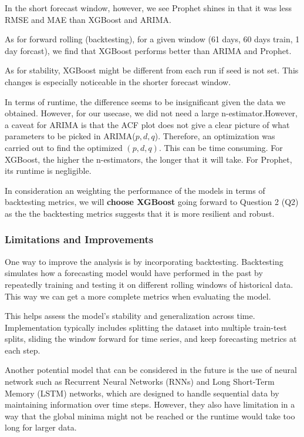 \documentclass[11pt]{article}
\begin{document}
In the short forecast window, however, we see Prophet shines in that it
was less RMSE and MAE than XGBoost and ARIMA.

As for forward rolling (backtesting), for a given window (61 days, 60
days train, 1 day forcast), we find that XGBoost performs better than
ARIMA and Prophet.

As for stability, XGBoost might be different from each run if seed is
not set. This changes is especially noticeable in the shorter forecast
window.

In terms of runtime, the difference seems to be insignificant given the
data we obtained. However, for our usecase, we did not need a large
n-estimator.However, a caveat for ARIMA is that the ACF plot does not
give a clear picture of what parameters to be picked in
ARIMA(\(p,d,q\)). Therefore, an optimization was carried out to find the
optimized \((p,d,q)\). This can be time consuming. For XGBoost, the
higher the n-estimators, the longer that it will take. For Prophet, its
runtime is negligible.

In consideration an weighting the performance of the models in terms of
backtesting metrics, we will {\textbf{choose XGBoost}} going forward to
Question 2 (Q2) as the the backtesting metrics suggests that it is more
resilient and robust.

    \subsubsection{\texorpdfstring{{\textbf{Limitations and
Improvements}}}{Limitations and Improvements}}\label{limitations-and-improvements}

One way to improve the analysis is by incorporating backtesting.
Backtesting simulates how a forecasting model would have performed in
the past by repeatedly training and testing it on different rolling
windows of historical data. This way we can get a more complete metrics
when evaluating the model.

This helps assess the model's stability and generalization across time.
Implementation typically includes splitting the dataset into multiple
train-test splits, sliding the window forward for time series, and keep
forecasting metrics at each step.

Another potential model that can be considered in the future is the use
of neural network such as Recurrent Neural Networks (RNNs) and Long
Short-Term Memory (LSTM) networks, which are designed to handle
sequential data by maintaining information over time steps. However,
they also have limitation in a way that the global minima might not be
reached or the runtime would take too long for larger data.
\end{document}
